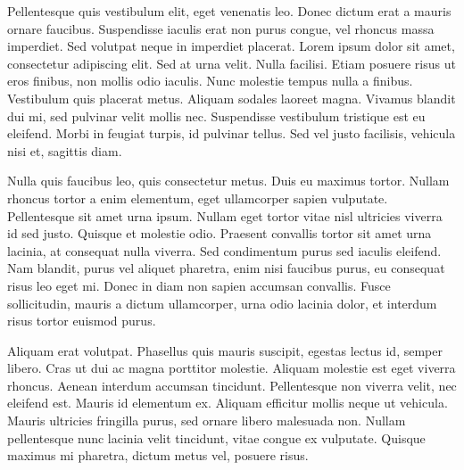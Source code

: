 Pellentesque quis vestibulum elit, eget venenatis leo. Donec dictum erat a mauris ornare faucibus. Suspendisse iaculis erat non purus congue, vel rhoncus massa imperdiet. Sed volutpat neque in imperdiet placerat. Lorem ipsum dolor sit amet, consectetur adipiscing elit. Sed at urna velit. Nulla facilisi. Etiam posuere risus ut eros finibus, non mollis odio iaculis. Nunc molestie tempus nulla a finibus. Vestibulum quis placerat metus. Aliquam sodales laoreet magna. Vivamus blandit dui mi, sed pulvinar velit mollis nec. Suspendisse vestibulum tristique est eu eleifend. Morbi in feugiat turpis, id pulvinar tellus. Sed vel justo facilisis, vehicula nisi et, sagittis diam.

Nulla quis faucibus leo, quis consectetur metus. Duis eu maximus tortor. Nullam rhoncus tortor a enim elementum, eget ullamcorper sapien vulputate. Pellentesque sit amet urna ipsum. Nullam eget tortor vitae nisl ultricies viverra id sed justo. Quisque et molestie odio. Praesent convallis tortor sit amet urna lacinia, at consequat nulla viverra. Sed condimentum purus sed iaculis eleifend. Nam blandit, purus vel aliquet pharetra, enim nisi faucibus purus, eu consequat risus leo eget mi. Donec in diam non sapien accumsan convallis. Fusce sollicitudin, mauris a dictum ullamcorper, urna odio lacinia dolor, et interdum risus tortor euismod purus.

Aliquam erat volutpat. Phasellus quis mauris suscipit, egestas lectus id, semper libero. Cras ut dui ac magna porttitor molestie. Aliquam molestie est eget viverra rhoncus. Aenean interdum accumsan tincidunt. Pellentesque non viverra velit, nec eleifend est. Mauris id elementum ex. Aliquam efficitur mollis neque ut vehicula. Mauris ultricies fringilla purus, sed ornare libero malesuada non. Nullam pellentesque nunc lacinia velit tincidunt, vitae congue ex vulputate. Quisque maximus mi pharetra, dictum metus vel, posuere risus.
